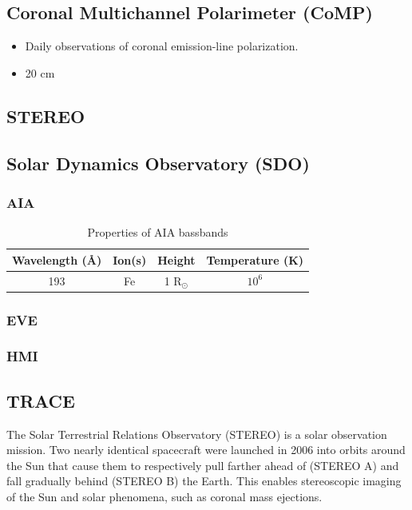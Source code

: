 \documentclass{article}
\begin{document}
\subsection{Coronal Multichannel Polarimeter (CoMP)}
\begin{itemize}
    \item Daily observations of coronal emission-line polarization.
    \item 20 cm
\end{itemize}

\subsection{STEREO}
\subsection{Solar Dynamics Observatory (SDO)}
\subsubsection{AIA}
\begin{table}[h]
    \centering
    \begin{tabular}{c c c c}
        Wavelength (\AA{}) & Ion(s) & Height & Temperature (K)\\
        \hline
        193 & Fe & 1 R$_{\odot}$ & $10^{6}$\\
        \hline\hline
    \end{tabular}
    \caption{Properties of AIA bassbands}
\end{table}
\subsubsection{EVE}
\subsubsection{HMI}
\subsection{TRACE}
The Solar Terrestrial Relations Observatory (STEREO) is a solar observation
mission. Two nearly identical spacecraft were launched in 2006 into
orbits around the Sun that cause them to respectively pull farther ahead
of (STEREO A)
and fall gradually behind (STEREO B) the Earth. This enables stereoscopic
imaging of the Sun and solar phenomena, such as coronal mass ejections.
\end{document}
